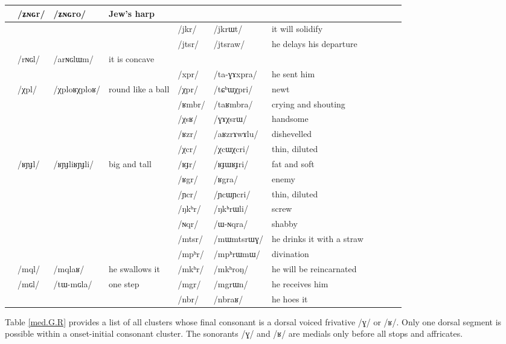 \documentclass[oldfontcommands,oneside,a4paper,11pt]{article}
\newcommand{\ipa}[1]{{\phon/#1/}} %
\newcommand{\trois}[1]{/#1/}
\newcommand{\tib}[1]{\cellcolor{lightgray}\textbf{#1}}
\newcommand{\idph}[1]{\cellcolor{gray}\textbf{#1}}
\begin{document}
\begin{table}
{\begin{tabular}{l|lll|lll|lll|l}
	& \trois{ʑɴɢr}  	& \ipa{ʑɴɢro}  	&Jew's harp 	&	&	&\\	
\midrule							
	&	&	&	&\trois{jkr}  	& \ipa{jkrɯt}  	& it will solidify \\	
	&	&	&	&\trois{jtsr}  	& \ipa{jtsraw}  	&he delays his departure \\	
\midrule			
	& \trois{rɴɢl}  	& \ipa{arɴɢlɯm}  	&it is concave 	&	&	&\\	
	&	&	&	& \trois{xpr}  	& \ipa{ta-ɣɤxpra}  	&he sent him \\	
\midrule							
	&\trois{χpl} \idph{}	&\ipa{χploʁχploʁ}  	&round like a ball	&\trois{χpr}  	& \ipa{tɕʰɯχpri}  	& newt\\	
	&	&	&	&\trois{ʁmbr}  	& \ipa{taʁmbra}  	& crying and shouting\\	
	&	&	&	&\trois{χsʁ}  	& \ipa{ɣɤχsrɯ}  	& handsome \\	
	&	&	&	&\trois{ʁzr}  	& \ipa{aʁzrɤwɤlu}  	& dishevelled\\	
	&	&	&	&\trois{χcr} \idph{} 	& \ipa{χcɯχcri}  	& thin, diluted \\	
	&\trois{ʁɲɟl}  \idph{}	& \ipa{ʁɲɟliʁɲɟli}  	& big and tall	&\trois{ʁɟr}  \idph{}	& \ipa{ʁɟɯʁɟri}  	& fat and soft\\	
	&	&	&	&\trois{ʁgr} \tib{}  	& \ipa{ʁgra}  	& enemy\\	
\midrule							
	&	&	&	&\trois{ɲcr} \idph{} 	& \ipa{ɲcɯɲcri}  	&thin, diluted \\	
	&	&	&	&\trois{ŋkʰr}  	& \ipa{ŋkʰrɯli}  	&screw \\	
	&	&	&	&\trois{ɴqr}  	& \ipa{ɯ-ɴqra}  	& shabby\\	
\midrule							
	&	&	&	&\trois{mtsr}  	& \ipa{mɯmtsrɯɣ}  	&he drinks it with a straw \\	
	&	&	&	&\trois{mpʰr}  	& \ipa{mpʰrɯmɯ}  	& divination\\	
	&\trois{mql}  	& \ipa{mqlaʁ}  	& he swallows it	&\trois{mkʰr}  	& \ipa{mkʰroŋ}  	&he will be reincarnated \\	
	&\trois{mɢl}  	& \ipa{tɯ-mɢla}  	& one step	&\trois{mgr}  	& \ipa{mgrɯn}  	& he receives him\\	
\midrule							
	&	&	&	&\trois{nbr}  	& \ipa{nbraʁ}  	&he hoes it \\	
\end{tabular}}
\end{table}	
						
		Table  \ref{med.G.R} provides a  list of all clusters whose final consonant is a dorsal voiced frivative  \ipa{ɣ} or \ipa{ʁ}.  Only one dorsal segment is possible within a onset-initial consonant cluster. The sonorants \ipa{ɣ} and \ipa{ʁ} are medials only before all stops and affricates.
						
\end{document}
